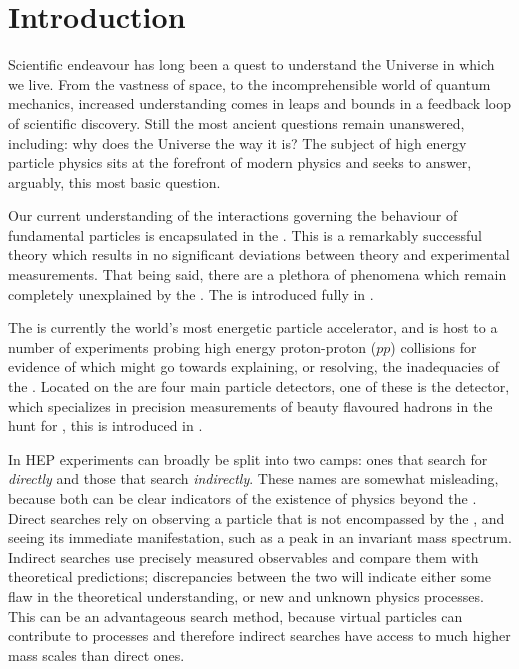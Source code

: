 \chapter{Introduction}
\label{ch:intro}

Scientific endeavour has long been a quest to understand the Universe in which we live.
From the vastness of space, to the incomprehensible world of quantum mechanics,
increased understanding comes in leaps and bounds in a feedback loop of scientific discovery.
Still the most ancient questions remain unanswered, including: why does the Universe the way it is?
The subject of high energy particle physics sits at the forefront of modern physics and seeks to
answer, arguably, this most basic question.

Our current understanding of the interactions governing the behaviour of fundamental particles is
encapsulated in the \sm.
This is a remarkably successful theory which results in no significant deviations between theory
and experimental measurements.
That being said, there are a plethora of phenomena which remain completely unexplained by the \sm.
The \sm is introduced fully in .

The \lhc is currently the world's most energetic particle accelerator, and is host to a number of
experiments probing high energy proton-proton ($pp$) collisions for evidence of \np
which might go towards explaining, or resolving, the inadequacies of the \sm.
Located on the \lhc are four main particle detectors, one of these is the \lhcb detector, which
specializes in precision measurements of beauty flavoured hadrons in the hunt for \np, this is
introduced in .

In \gls{HEP} experiments can broadly be split into two camps: ones that search for \np
\emph{directly} and those that search \emph{indirectly}.
These names are somewhat misleading, because both can be clear indicators of the existence of
physics beyond the \sm.
Direct searches rely on observing a particle that is not encompassed by the \sm,
and seeing its immediate manifestation, such as a peak in an invariant mass spectrum.
Indirect searches
use precisely measured observables and compare them with theoretical predictions; discrepancies
between the two will indicate either some flaw in the theoretical understanding, or new and unknown
physics processes.
This can be an advantageous search method, because virtual particles can contribute to processes
and therefore indirect searches have access to much higher mass scales than direct ones.

